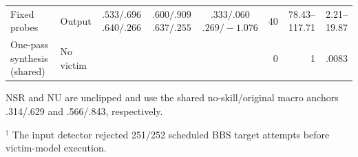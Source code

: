 \documentclass[letterpaper,twocolumn,10pt]{article}
\begin{document}
\begin{table}[!hbt]
\begin{tabularx}{\textwidth}{@{}lYcccrrr@{}}
    \addlinespace[1.8pt]

    Fixed probes &
      Output &
       &
       &
       &
      40 & 78.43--117.71 & 2.21--19.87\\

    \addlinespace[1.8pt]

    One-pass synthesis (shared) &
      No victim &
       &
      0 & 1 & .0083\\

    \bottomrule
  \end{tabularx}

  \vspace{2pt}
  \parbox{\textwidth}{\scriptsize\raggedright
  NSR and NU are unclipped and use the shared no-skill/original
  macro anchors .314/.629 and .566/.843, respectively.
  \par
  $^\dagger$ The input detector rejected 251/252 scheduled BBS target attempts
  before victim-model execution.}
\end{table}
\end{document}
